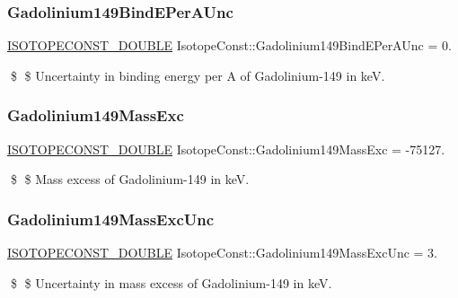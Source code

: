 \subsubsection{\texorpdfstring{Gadolinium149\+Bind\+E\+Per\+A\+Unc}{Gadolinium149BindEPerAUnc}}
{\footnotesize\ttfamily \mbox{\hyperlink{group___isotope_const-_macros_ga8f45a7272ce02c0b4c65c44636ed719a}{I\+S\+O\+T\+O\+P\+E\+C\+O\+N\+S\+T\+\_\+\+D\+O\+U\+B\+LE}} Isotope\+Const\+::\+Gadolinium149\+Bind\+E\+Per\+A\+Unc = 0.}

\$ \$ Uncertainty in binding energy per A of Gadolinium-\/149 in keV. \mbox{\label{group___isotope_const-_gadolinium-_gd149_gab9e78547869c97c34cd596ac12a39845}} 
\subsubsection{\texorpdfstring{Gadolinium149\+Mass\+Exc}{Gadolinium149MassExc}}
{\footnotesize\ttfamily \mbox{\hyperlink{group___isotope_const-_macros_ga8f45a7272ce02c0b4c65c44636ed719a}{I\+S\+O\+T\+O\+P\+E\+C\+O\+N\+S\+T\+\_\+\+D\+O\+U\+B\+LE}} Isotope\+Const\+::\+Gadolinium149\+Mass\+Exc = -\/75127.}

\$ \$ Mass excess of Gadolinium-\/149 in keV. \mbox{\label{group___isotope_const-_gadolinium-_gd149_ga1751243b0f1e30f461a17e6fe2ca3293}} 
\subsubsection{\texorpdfstring{Gadolinium149\+Mass\+Exc\+Unc}{Gadolinium149MassExcUnc}}
{\footnotesize\ttfamily \mbox{\hyperlink{group___isotope_const-_macros_ga8f45a7272ce02c0b4c65c44636ed719a}{I\+S\+O\+T\+O\+P\+E\+C\+O\+N\+S\+T\+\_\+\+D\+O\+U\+B\+LE}} Isotope\+Const\+::\+Gadolinium149\+Mass\+Exc\+Unc = 3.}

\$ \$ Uncertainty in mass excess of Gadolinium-\/149 in keV. \mbox{\label{group___isotope_const-_gadolinium-_gd149_ga5a9951856e60926594c003224c7057c8}} 
